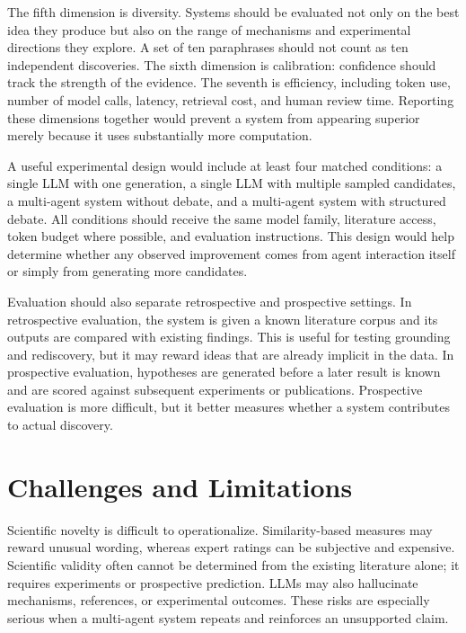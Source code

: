 \documentclass[11pt]{article}
\begin{document}
The fifth dimension is diversity. Systems should be evaluated not only on the best idea they produce
but also on the range of mechanisms and experimental directions they explore. A set of ten
paraphrases should not count as ten independent discoveries. The sixth dimension is calibration:
confidence should track the strength of the evidence. The seventh is efficiency, including token use,
number of model calls, latency, retrieval cost, and human review time. Reporting these dimensions
together would prevent a system from appearing superior merely because it uses substantially more
computation.

A useful experimental design would include at least four matched conditions: a single LLM with
one generation, a single LLM with multiple sampled candidates, a multi-agent system without
debate, and a multi-agent system with structured debate. All conditions should receive the same
model family, literature access, token budget where possible, and evaluation instructions. This
design would help determine whether any observed improvement comes from agent interaction
itself or simply from generating more candidates.

Evaluation should also separate retrospective and prospective settings. In retrospective evaluation,
the system is given a known literature corpus and its outputs are compared with existing findings.
This is useful for testing grounding and rediscovery, but it may reward ideas that are already
implicit in the data. In prospective evaluation, hypotheses are generated before a later result is
known and are scored against subsequent experiments or publications. Prospective evaluation is
more difficult, but it better measures whether a system contributes to actual discovery.

\section{Challenges and Limitations}
\label{sec:challenges-limitations}

Scientific novelty is difficult to operationalize. Similarity-based measures may reward unusual
wording, whereas expert ratings can be subjective and expensive. Scientific validity often cannot
be determined from the existing literature alone; it requires experiments or prospective prediction.
LLMs may also hallucinate mechanisms, references, or experimental outcomes. These risks are
especially serious when a multi-agent system repeats and reinforces an unsupported claim.
\end{document}

